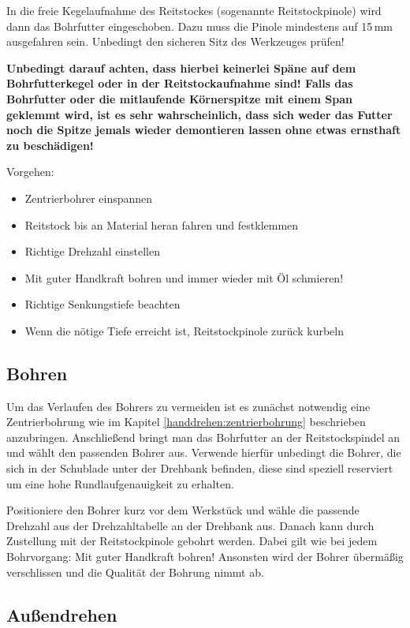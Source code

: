 \documentclass{\basedir/fablab-document}
\begin{document}
In die freie Kegelaufnahme des Reitstockes (sogenannte Reitstockpinole) wird dann das Bohrfutter eingeschoben.
Dazu muss die Pinole mindestens auf 15\,mm ausgefahren sein.
Unbedingt den sicheren Sitz des Werkzeuges prüfen!

\textbf{Unbedingt darauf achten, dass hierbei keinerlei Späne auf dem Bohrfutterkegel oder in der Reitstockaufnahme sind! Falls das Bohrfutter oder die mitlaufende Körnerspitze mit einem Span geklemmt wird, ist es sehr wahrscheinlich, dass sich weder das Futter noch die Spitze jemals wieder demontieren lassen ohne etwas ernsthaft zu beschädigen!}

Vorgehen:
\begin{itemize}
\item Zentrierbohrer einspannen
\item Reitstock bis an Material heran fahren und festklemmen
\item Richtige Drehzahl einstellen
\item Mit guter Handkraft bohren und immer wieder mit Öl schmieren!
\item Richtige Senkungstiefe beachten
\item Wenn die nötige Tiefe erreicht ist, Reitstockpinole zurück kurbeln

\end{itemize}

\subsection{Bohren}

Um das Verlaufen des Bohrers zu vermeiden ist es zunächst notwendig eine Zentrierbohrung wie im Kapitel \ref{handdrehen:zentrierbohrung} beschrieben anzubringen.
Anschließend bringt man das Bohrfutter an der Reitstockspindel an und wählt den passenden Bohrer aus.
Verwende hierfür unbedingt die Bohrer, die sich in der Schublade unter der Drehbank befinden, diese sind speziell reserviert um eine hohe Rundlaufgenauigkeit zu erhalten.

Positioniere den Bohrer kurz vor dem Werkstück und wähle die passende Drehzahl aus der Drehzahltabelle  an der Drehbank aus.
Danach kann durch Zustellung mit der Reitstockpinole gebohrt werden.
Dabei gilt wie bei jedem Bohrvorgang: Mit guter Handkraft bohren!
Ansonsten wird der Bohrer übermäßig verschlissen und die Qualität der Bohrung nimmt ab.

\subsection{Außendrehen} 
\end{document}
